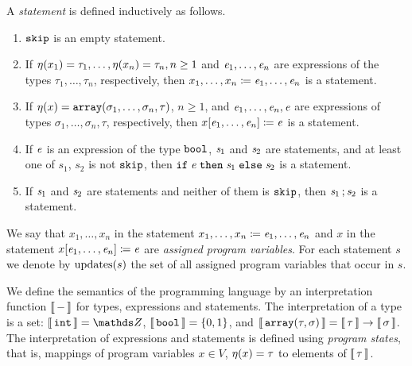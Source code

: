 \begin{definition}\label{def:boogie/statement}
A \emph{statement} is defined inductively as follows.
\begin{enumerate}
  \item $\mathtt{skip}$ is an empty statement.
  \item If $\eta(x_1)=\tau_1,\ldots,\eta(x_n)=\tau_n,n\ge1$ and $\mathit{e}_1,\ldots,\mathit{e}_n$ are expressions of the types $\tau_1,\ldots,\tau_n$, respectively, then ${x_1,\ldots,x_n}\coloneqq{\mathit{e}_1,\ldots,\mathit{e}_n}$ is a statement.
  \item If $\eta(x)=\mathtt{array}(\sigma_1,\ldots,\sigma_n,\tau)$, $n\ge1$, and $\mathit{e}_1,\ldots,\allowbreak\mathit{e}_n,\allowbreak\mathit{e}$ are expressions of types $\sigma_1,\ldots,\sigma_n,\tau$, respectively, then ${x[\mathit{e}_1,\ldots,\mathit{e}_n]}\coloneqq{\mathit{e}}$ is a statement.
  \item If $\mathit{e}$ is an expression of the type $\mathtt{bool}$, $\mathit{s}_1$ and $\mathit{s}_2$ are statements, and at least one of $s_1$, $s_2$ is not $\mathtt{skip}$, then $\mathtt{if}\;{\mathit{e}}\;\allowbreak\mathtt{then}\;{\mathit{s}_1}\;\allowbreak\mathtt{else}\;{\mathit{s}_2}$ is a statement.
  \item If $\mathit{s}_1$ and $\mathit{s}_2$ are statements and neither of them is $\mathtt{skip}$, then ${\mathit{s}_1}\,;{\mathit{s}_2}$ is a statement. \QED
\end{enumerate}
\end{definition}

We say that $x_1,\ldots,x_n$ in the statement ${x_1,\ldots,x_n}\coloneqq{\mathit{e}_1,\ldots,\mathit{e}_n}$ and $x$ in the statement ${x[\mathit{e}_1,\ldots,\mathit{e}_n]}\coloneqq{\mathit{e}}$ are \emph{assigned program variables}. For each statement $s$ we denote by $\mathrm{updates}({s})$ the set of all assigned program variables that occur in $s$.

We define the semantics of the programming language by an interpretation function $\left\llbracket\,{-}\,\right\rrbracket$ for types, expressions and statements. The interpretation of a type is a set: $\interp{\pint}=\Z$, $\left\llbracket\,{\mathtt{bool}}\,\right\rrbracket=\{0,1\}$, and $\left\llbracket\,{\mathtt{array}(\tau,\sigma)}\,\right\rrbracket = \left\llbracket\,{\tau}\,\right\rrbracket\to\left\llbracket\,{\sigma}\,\right\rrbracket$. The interpretation of expressions and statements is defined using \emph{program states}, that is, mappings of program variables $x\in V$, $\eta(x)=\tau$ to elements of $\left\llbracket\,{\tau}\,\right\rrbracket$.

